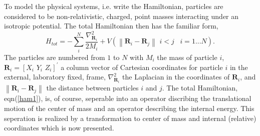 \documentclass[12pt,thmsa]{article}
\begin{document}
To model the physical systems, i.e. write the Hamiltonian, particles are
considered to be non-relativistic, charged, point masses interacting under
an isotropic potential. The total Hamiltonian then has the familiar form, 
\begin{equation}
H_{tot}=-\sum_i^N\frac{\nabla _{\mathbf{R}_i}^2}{2M_i}+V\left( \left\| 
\mathbf{R}_i-\mathbf{R}_j\right\| \,\,i<j\,\,\,\,\,i=1...N\right) .
\label{ham1}
\end{equation}
The particles are numbered from $1$ to $N$ with $M_i$ the mass of particle $%
i $, $\mathbf{R}_i=[X_i\,\,Y_i\,\,Z_i]^{\prime }$ a column vector of
Cartesian coordinates for particle $i$ in the external, laboratory fixed,
frame, $\nabla _{\mathbf{R}_i}^2$ the Laplacian in the coordinates of $%
\mathbf{R}_i$, and $\left\| \mathbf{R}_i-\mathbf{R}_j\right\| $ the distance
between particles $i$ and $j$. The total Hamiltonian, eqn(\ref{ham1}), is,
of course, seperable into an operator discribing the translational motion of
the center of mass and an operator describing the internal energy. This
seperation is realized by a transformation to center of mass and internal
(relative) coordinates which is now presented.
\end{document}
